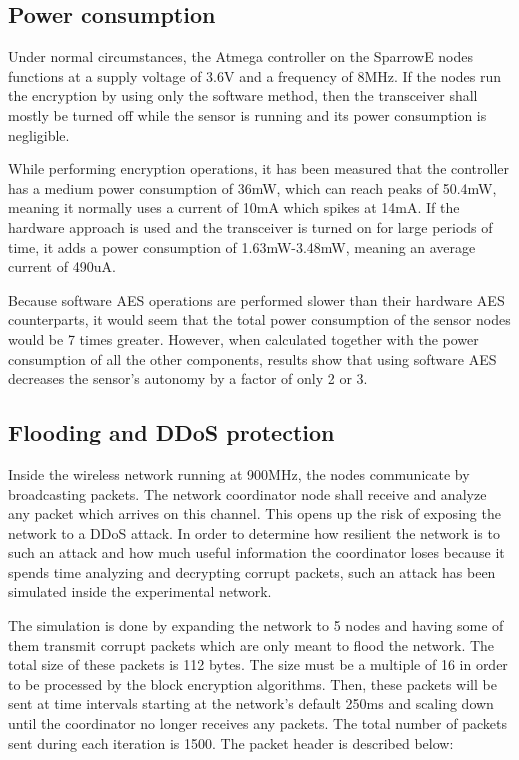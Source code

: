 \subsection{Power consumption}

Under normal circumstances, the Atmega controller on the SparrowE nodes functions at a 
supply voltage of 3.6V and a frequency of 8MHz. If the nodes run the encryption by using 
only the software method, then the transceiver shall mostly be turned off while the sensor is 
running and its power consumption is negligible.

While performing encryption operations, it has been measured that the controller has a medium 
power consumption of 36mW, which can reach peaks of 50.4mW, meaning it normally uses a current 
of 10mA which spikes at 14mA. If the hardware approach is used and the transceiver is turned on 
for large periods of time, it adds a power consumption of 1.63mW-3.48mW, meaning an average 
current of 490uA.

Because software AES operations are performed slower than their hardware AES counterparts, 
it would seem that the total power consumption of the sensor nodes would be 7 times greater.
However, when calculated together with the power consumption of all the other components, 
results show that using software AES decreases the sensor's autonomy by a factor of only 
2 or 3.

\subsection{Flooding and DDoS protection}

Inside the wireless network running at 900MHz, the nodes communicate by broadcasting packets.
The network coordinator node shall receive and analyze any packet which arrives on this channel.
This opens up the risk of exposing the network to a DDoS attack. In order to determine how 
resilient the network is to such an attack and how much useful information the coordinator 
loses because it spends time analyzing and decrypting corrupt packets, such an attack has been 
simulated inside the experimental network.

The simulation is done by expanding the network to 5 nodes and having some of them transmit 
corrupt packets which are only meant to flood the network. The total size of these packets is 
112 bytes. The size must be a multiple of 16 in order to be processed by the block encryption 
algorithms. Then, these packets will be sent at time intervals starting at the network's default 
250ms and scaling down until the coordinator no longer receives any packets. The total number 
of packets sent during each iteration is 1500. The packet header is described below:

